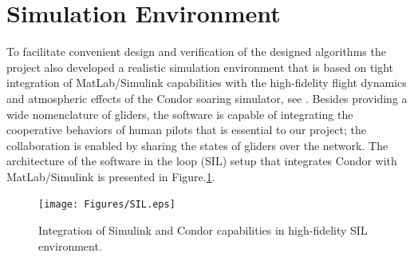 \documentclass{ifacconf}
\begin{document}
\section{Simulation Environment}
\label{sec:SimEnv}
To facilitate convenient design and verification of the designed algorithms the project also developed a realistic simulation environment that is based on tight integration of MatLab/Simulink capabilities with the high-fidelity flight dynamics and atmospheric effects of the Condor soaring simulator, see \cite{Condor:2013:Online}. Besides providing a wide nomenclature of gliders, the software is capable of integrating the cooperative behaviors of human pilots that is essential to our project; the collaboration is enabled by sharing the states of gliders over the network. The architecture of the software in the loop (SIL) setup that integrates Condor with MatLab/Simulink is presented in Figure.\ref{fig:SIL}.


\begin{figure}[thpb]
  \centering
  \texttt{[image: Figures/SIL.eps]}
  \caption{Integration of Simulink and Condor capabilities in high-fidelity SIL environment.}
  \label{fig:SIL}
\end{figure}
\end{document}
